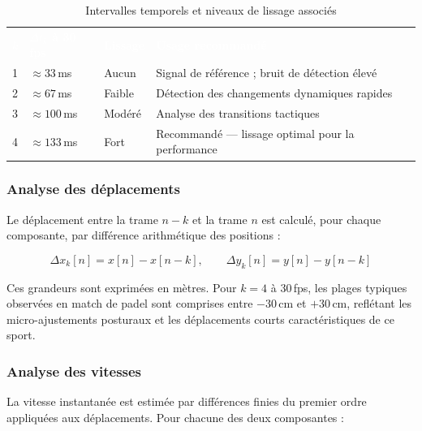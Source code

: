 \begin{table}[H]
  \centering
  \renewcommand{\arraystretch}{1.3}
  \begin{tabularx}{\textwidth}{C{1cm} C{2.5cm} C{2cm} X}
    \textcolor{white}{\textbf{$k$}} &
    \textcolor{white}{\textbf{$\Delta t_k$ à 30\,fps}} &
    \textcolor{white}{\textbf{Lissage}} &
    \textcolor{white}{\textbf{Usage recommandé}} \\
    1 & $\approx 33$\,ms  & Aucun   & Signal de référence ; bruit de détection élevé \\
    2 & $\approx 67$\,ms  & Faible  & Détection des changements dynamiques rapides \\
    3 & $\approx 100$\,ms & Modéré  & Analyse des transitions tactiques \\
    4 & $\approx 133$\,ms & Fort    & Recommandé — lissage optimal pour la performance \\
  \end{tabularx}
  \caption{Intervalles temporels et niveaux de lissage associés}
  \label{tab:niveaux_lissage}
\end{table}

\subsubsection{Analyse des déplacements}

Le déplacement entre la trame $n-k$ et la trame $n$ est calculé, pour chaque composante,
par différence arithmétique des positions :

\begin{equation}
  \Delta x_k[n] = x[n] - x[n-k], \qquad \Delta y_k[n] = y[n] - y[n-k]
  \label{eq:deplacement}
\end{equation}

Ces grandeurs sont exprimées en mètres. Pour $k = 4$ à 30\,fps, les plages typiques
observées en match de padel sont comprises entre $-30$\,cm et $+30$\,cm, reflétant les
micro-ajustements posturaux et les déplacements courts caractéristiques de ce sport.

\subsubsection{Analyse des vitesses}

La vitesse instantanée est estimée par différences finies du premier ordre appliquées aux
déplacements. Pour chacune des deux composantes :

